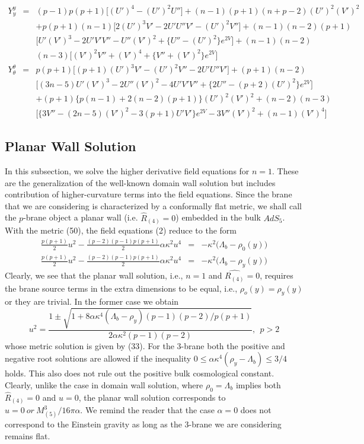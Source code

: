\documentclass[a4paper,12pt]{article}
\newcommand {\nn} {\nonumber}
\begin{document}
\begin{eqnarray}
Y_y^y&=&(p-1)p(p+1)\Big[(U')^4-(U')^2U''\Big]
+(n-1)(p+1)(n+p-2)(U')^2(V')^2\nn\\
&&+p(p+1)(n-1)\Big[2(U')^3V'-2U'U''V'-(U')^2V''\Big]+(n-1)(n-2)(p+1)\nn\\
&&\Big[U'(V')^3 -2U'V'V''-U''(V')^2+\big\{U''-(U')^2\big\}e^{2V}\Big]
+(n-1)(n-2)\nn\\
&&(n-3)\Big[(V')^2V''+(V')^4+\big\{V''+(V')^2\big\}e^{2V}\Big]
\end{eqnarray}
\begin{eqnarray}
Y_{\theta}^{\theta}&=&p(p+1)\Big[(p+1)(U')^3V'-(U')^2V''-2U'U''V'\Big]
+(p+1)(n-2)\nn\\
&&\Big[(3n-5)U'(V')^3-2U''(V')^2-4U'V'V''+\big\{2U''-(p+2)(U')^2\big\}e^{2V}
\Big]\nn\\
&&+(p+1)\big\{p(n-1)+2(n-2)(p+1)\big\}(U')^2(V')^2+(n-2)(n-3)\nn\\
&&\Big[\big\{3V''-(2n-5)(V')^2-3(p+1)U'V'\big\}e^{2V}-3V''(V')^2+
(n-1)(V')^4\Big]
\end{eqnarray}
\subsection{Planar Wall Solution}
   In this subsection, we solve the higher derivative field equations for 
$n=1$. These are the generalization of the well-known domain 
wall solution but includes contribution of higher-curvature terms 
into the field equations. Since the brane that we are considering is 
characterized by a conformally flat metric, we shall call the $p$-brane 
object a planar wall (i.e. $\hat{R}_{(4)}=0$) embedded in the bulk $AdS_5$. 
With the metric (50), the field equations (2) reduce to the form 
\begin{eqnarray}
\frac{p(p+1)}{2}u^2-\frac{(p-2)(p-1)p(p+1)}{2}\alpha\kappa^2 u^4
&=&-\kappa^2\big(\Lambda_b-\rho_0(y)\big)\\
\frac{p(p+1)}{2}u^2-\frac{(p-2)(p-1)p(p+1)}{2}\alpha\kappa^2 u^4
&=&-\kappa^2\big(\Lambda_b-\rho_y(y)\big)
\end{eqnarray}
Clearly, we see that the planar wall solution, i.e., $n=1$ and 
$\hat{R_{(4)}}=0$, requires the brane source terms in the extra 
dimensions to be equal, i.e., $\rho_o(y)=\rho_y(y)$ or they are trivial. 
In the former case we obtain 
\begin{equation}
 u^2=\frac{1\pm\sqrt{1+8\alpha\kappa^4(\Lambda_b-\rho_y)(p-1)(p-2)/{p(p+1)}}}
{2\alpha\kappa^2(p-1)(p-2)}, ~~ p > 2
\end{equation}
whose metric solution is given by (33). For the $3$-brane both the 
positive and negative root solutions are allowed 
if the inequality $0\leq\alpha\kappa^4(\rho_y-\Lambda_b)\leq3/4$ holds. 
This also does not rule out the positive bulk cosmological constant. 
Clearly, unlike the case in domain wall solution, where $\rho_0=\Lambda_b$ 
implies both $\hat{R}_{(4)}=0$ and $u=0$, the planar wall solution 
corresponds to $u=0 ~or ~M_{(5)}^3/{16\pi\alpha}$. 
We remind the reader that the case $\alpha=0$ does not correspond
to the Einstein gravity as long as the $3$-brane we are considering 
remains flat.
\end{document}
